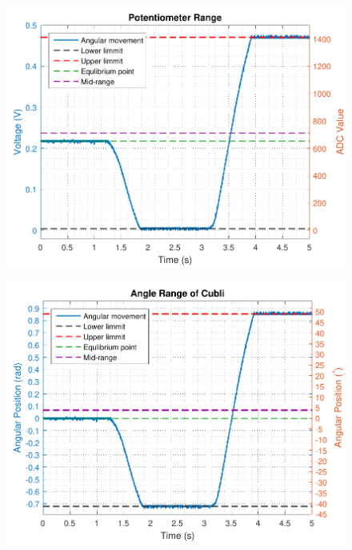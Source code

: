 \begin{minipage}{\linewidth}
  	\begin{minipage}{0.45\linewidth}
  		\begin{figure}[H]
  			\includegraphics[scale=.5]{figures/PotentiometerResolution}
  			\centering
  			\captionsetup{justification=centering}
  			\label{PotentiometerResolution}
  		\end{figure}
  	\end{minipage}
  	\hspace{0.03\linewidth}
  	\begin{minipage}{0.45\linewidth}
  		\begin{figure}[H]
  			\includegraphics[scale=.5]{figures/PotentiometerResolutionDegRad}
  			\centering
  			\captionsetup{justification=centering}
  			\label{PotentiometerResolutionRadDeg}
  		\end{figure}
  	\end{minipage}
\end{minipage}

